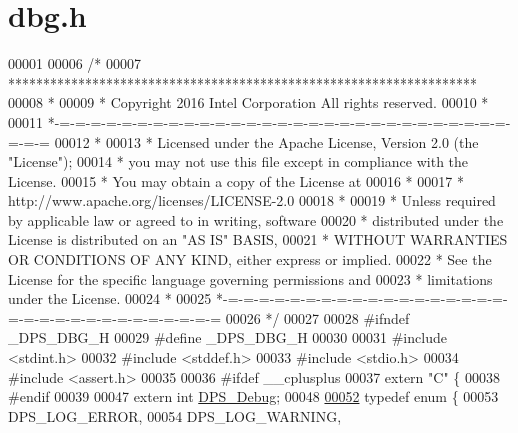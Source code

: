\hypertarget{dbg_8h_source}{}\section{dbg.\+h}
\label{dbg_8h_source}

\begin{DoxyCode}
00001 
00006 \textcolor{comment}{/*}
00007 \textcolor{comment}{ *******************************************************************}
00008 \textcolor{comment}{ *}
00009 \textcolor{comment}{ * Copyright 2016 Intel Corporation All rights reserved.}
00010 \textcolor{comment}{ *}
00011 \textcolor{comment}{ *-=-=-=-=-=-=-=-=-=-=-=-=-=-=-=-=-=-=-=-=-=-=-=-=-=-=-=-=-=-=-=-=}
00012 \textcolor{comment}{ *}
00013 \textcolor{comment}{ * Licensed under the Apache License, Version 2.0 (the "License");}
00014 \textcolor{comment}{ * you may not use this file except in compliance with the License.}
00015 \textcolor{comment}{ * You may obtain a copy of the License at}
00016 \textcolor{comment}{ *}
00017 \textcolor{comment}{ *      http://www.apache.org/licenses/LICENSE-2.0}
00018 \textcolor{comment}{ *}
00019 \textcolor{comment}{ * Unless required by applicable law or agreed to in writing, software}
00020 \textcolor{comment}{ * distributed under the License is distributed on an "AS IS" BASIS,}
00021 \textcolor{comment}{ * WITHOUT WARRANTIES OR CONDITIONS OF ANY KIND, either express or implied.}
00022 \textcolor{comment}{ * See the License for the specific language governing permissions and}
00023 \textcolor{comment}{ * limitations under the License.}
00024 \textcolor{comment}{ *}
00025 \textcolor{comment}{ *-=-=-=-=-=-=-=-=-=-=-=-=-=-=-=-=-=-=-=-=-=-=-=-=-=-=-=-=-=-=-=-=}
00026 \textcolor{comment}{ */}
00027 
00028 \textcolor{preprocessor}{#ifndef \_DPS\_DBG\_H}
00029 \textcolor{preprocessor}{#define \_DPS\_DBG\_H}
00030 
00031 \textcolor{preprocessor}{#include <stdint.h>}
00032 \textcolor{preprocessor}{#include <stddef.h>}
00033 \textcolor{preprocessor}{#include <stdio.h>}
00034 \textcolor{preprocessor}{#include <assert.h>}
00035 
00036 \textcolor{preprocessor}{#ifdef \_\_cplusplus}
00037 \textcolor{keyword}{extern} \textcolor{stringliteral}{"C"} \{
00038 \textcolor{preprocessor}{#endif}
00039 
00047 \textcolor{keyword}{extern} \textcolor{keywordtype}{int} \hyperlink{group__debug_ga6f4bedbcc8b3bd12cea20b5ce3a8abba}{DPS\_Debug};
00048 
\hyperlink{group__debug_gad06c0421a8226b0a95be1d722ca05612}{00052} \textcolor{keyword}{typedef} \textcolor{keyword}{enum} \{
00053     DPS\_LOG\_ERROR,
00054     DPS\_LOG\_WARNING,

\end{DoxyCode}
